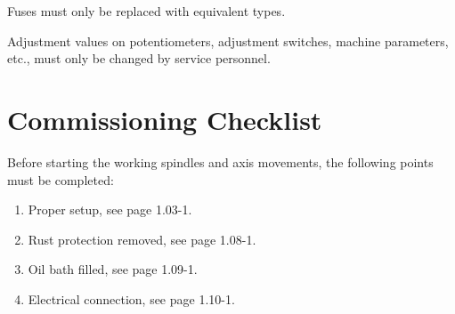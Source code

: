 


\noindent Fuses must only be replaced with equivalent types.

\vspace{.5cm}

\noindent Adjustment values on potentiometers, adjustment switches, machine parameters, etc., must only be changed by service personnel.

\section*{Commissioning Checklist}

Before starting the working spindles and axis movements, the following points must be completed:

\begin{enumerate}
    \item Proper setup, see page 1.03-1.
    \item Rust protection removed, see page 1.08-1.
    \item Oil bath filled, see page 1.09-1.
    \item Electrical connection, see page 1.10-1.
\end{enumerate}